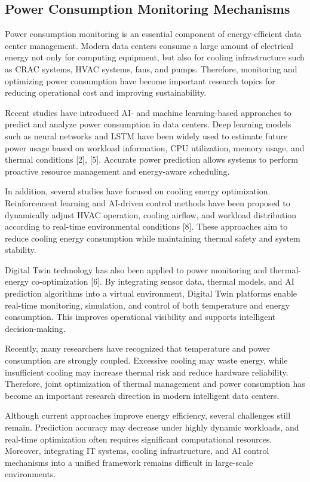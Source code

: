 \documentclass[conference]{IEEEtran}
\begin{document}
\subsection{Power Consumption Monitoring Mechanisms}
Power consumption monitoring is an essential component of energy-efficient data center management. Modern data centers consume a large amount of electrical energy not only for computing equipment, but also for cooling infrastructure such as CRAC systems, HVAC systems, fans, and pumps. Therefore, monitoring and optimizing power consumption have become important research topics for reducing operational cost and improving sustainability.

Recent studies have introduced AI- and machine learning-based approaches to predict and analyze power consumption in data centers. Deep learning models such as neural networks and LSTM have been widely used to estimate future power usage based on workload information, CPU utilization, memory usage, and thermal conditions [2], [5]. Accurate power prediction allows systems to perform proactive resource management and energy-aware scheduling.

In addition, several studies have focused on cooling energy optimization. Reinforcement learning and AI-driven control methods have been proposed to dynamically adjust HVAC operation, cooling airflow, and workload distribution according to real-time environmental conditions [8]. These approaches aim to reduce cooling energy consumption while maintaining thermal safety and system stability.

Digital Twin technology has also been applied to power monitoring and thermal-energy co-optimization [6]. By integrating sensor data, thermal models, and AI prediction algorithms into a virtual environment, Digital Twin platforms enable real-time monitoring, simulation, and control of both temperature and energy consumption. This improves operational visibility and supports intelligent decision-making.

Recently, many researchers have recognized that temperature and power consumption are strongly coupled. Excessive cooling may waste energy, while insufficient cooling may increase thermal risk and reduce hardware reliability. Therefore, joint optimization of thermal management and power consumption has become an important research direction in modern intelligent data centers.

Although current approaches improve energy efficiency, several challenges still remain. Prediction accuracy may decrease under highly dynamic workloads, and real-time optimization often requires significant computational resources. Moreover, integrating IT systems, cooling infrastructure, and AI control mechanisms into a unified framework remains difficult in large-scale environments.
\end{document}
